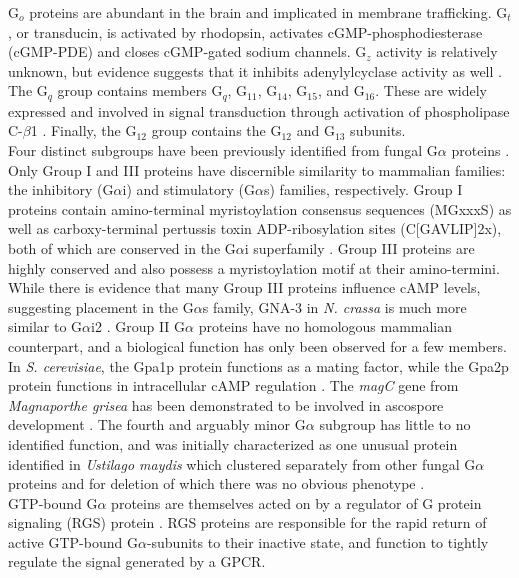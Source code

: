 G$_{o}$ proteins are abundant in the brain and implicated in membrane trafficking. 
G$_{t}$, or transducin, is activated by rhodopsin, activates cGMP-phosphodiesterase (cGMP-PDE) 
and closes cGMP-gated sodium channels. G$_{z}$ activity is relatively unknown, 
but evidence suggests that it inhibits adenylylcyclase activity as well \cite{KABMycotaIII}. 
The G$_{q}$ group contains members G$_{q}$, G$_{11}$, G$_{14}$, G$_{15}$, and G$_{16}$. 
These are widely expressed and involved in signal transduction through activation of phospholipase C-$\beta$1 \cite{KABMycotaIII}. 
Finally, the G$_{12}$ group contains the G$_{12}$ and G$_{13}$ subunits.\\
\indent Four distinct subgroups have been previously identified from fungal G$\alpha$ proteins \cite{Bolker1998}. Only Group I and III proteins have discernible similarity to mammalian families: the inhibitory (G$\alpha$i) and stimulatory (G$\alpha$s) families, respectively. Group I proteins contain amino-terminal myristoylation consensus sequences (MGxxxS) as well as carboxy-terminal pertussis toxin ADP-ribosylation sites (C[GAVLIP]{2}x), both of which are conserved in the G$\alpha$i superfamily \cite{Li2007}. Group III proteins are highly conserved and also possess a myristoylation motif at their amino-termini. While there is evidence that many Group III proteins influence cAMP levels, suggesting placement in the G$\alpha$s family, GNA-3 in \textit{N. crassa} is much more similar to G$\alpha$i2 \cite{Li2007}. Group II G$\alpha$ proteins have no homologous mammalian counterpart, and a biological function has only been observed for a few members. In \textit{S. cerevisiae}, the Gpa1p protein functions as a mating factor, while the Gpa2p protein functions in intracellular cAMP regulation \cite{KABMycotaIII}. The \textit{magC} gene from \textit{Magnaporthe grisea} has been demonstrated to be involved in ascospore development \cite{Liu1997}. The fourth and arguably minor G$\alpha$ subgroup has little to no identified function, and was initially characterized as one unusual protein identified in \textit{Ustilago maydis} which clustered separately from other fungal G$\alpha$ proteins and for deletion of which there was no obvious phenotype \cite{Bolker1998}.\\
\indent GTP-bound G$\alpha$ proteins are themselves acted on by a regulator of G protein signaling (RGS) protein \cite{DeVries2000}. RGS proteins are responsible for the rapid return of active GTP-bound G$\alpha$-subunits to their inactive state, and function to tightly regulate the signal generated by a GPCR. \\
